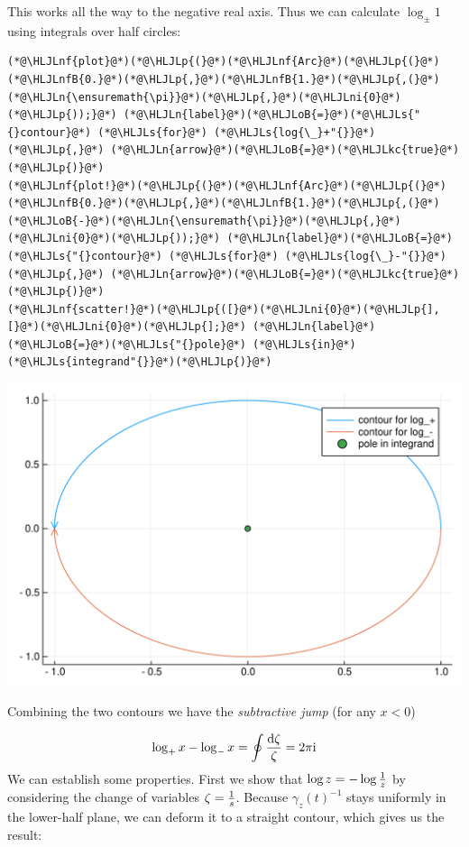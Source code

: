 \documentclass[12pt,a4paper]{article}
\newcommand{\HLJLkc}[1]{\textcolor[RGB]{59,151,46}{\textit{#1}}}
\newcommand{\HLJLn}[1]{#1}
\newcommand{\HLJLnf}[1]{\textcolor[RGB]{66,102,213}{#1}}
\newcommand{\HLJLs}[1]{\textcolor[RGB]{201,61,57}{#1}}
\newcommand{\HLJLnfB}[1]{\textcolor[RGB]{59,151,46}{#1}}
\newcommand{\HLJLni}[1]{\textcolor[RGB]{59,151,46}{#1}}
\newcommand{\HLJLoB}[1]{\textcolor[RGB]{102,102,102}{\textbf{#1}}}
\newcommand{\HLJLp}[1]{#1}
\def\D{ {\rm d} }
\def\I{ {\rm i} }
\begin{document}
This works all the way to the negative real axis. Thus we can calculate $\log_\pm 1$ using integrals over half circles:


\begin{lstlisting}
(*@\HLJLnf{plot}@*)(*@\HLJLp{(}@*)(*@\HLJLnf{Arc}@*)(*@\HLJLp{(}@*)(*@\HLJLnfB{0.}@*)(*@\HLJLp{,}@*)(*@\HLJLnfB{1.}@*)(*@\HLJLp{,(}@*)(*@\HLJLn{\ensuremath{\pi}}@*)(*@\HLJLp{,}@*)(*@\HLJLni{0}@*)(*@\HLJLp{));}@*) (*@\HLJLn{label}@*)(*@\HLJLoB{=}@*)(*@\HLJLs{"{}contour}@*) (*@\HLJLs{for}@*) (*@\HLJLs{log{\_}+"{}}@*)(*@\HLJLp{,}@*) (*@\HLJLn{arrow}@*)(*@\HLJLoB{=}@*)(*@\HLJLkc{true}@*)(*@\HLJLp{)}@*)
(*@\HLJLnf{plot!}@*)(*@\HLJLp{(}@*)(*@\HLJLnf{Arc}@*)(*@\HLJLp{(}@*)(*@\HLJLnfB{0.}@*)(*@\HLJLp{,}@*)(*@\HLJLnfB{1.}@*)(*@\HLJLp{,(}@*)(*@\HLJLoB{-}@*)(*@\HLJLn{\ensuremath{\pi}}@*)(*@\HLJLp{,}@*)(*@\HLJLni{0}@*)(*@\HLJLp{));}@*) (*@\HLJLn{label}@*)(*@\HLJLoB{=}@*)(*@\HLJLs{"{}contour}@*) (*@\HLJLs{for}@*) (*@\HLJLs{log{\_}-"{}}@*)(*@\HLJLp{,}@*) (*@\HLJLn{arrow}@*)(*@\HLJLoB{=}@*)(*@\HLJLkc{true}@*)(*@\HLJLp{)}@*)
(*@\HLJLnf{scatter!}@*)(*@\HLJLp{([}@*)(*@\HLJLni{0}@*)(*@\HLJLp{],[}@*)(*@\HLJLni{0}@*)(*@\HLJLp{];}@*) (*@\HLJLn{label}@*)(*@\HLJLoB{=}@*)(*@\HLJLs{"{}pole}@*) (*@\HLJLs{in}@*) (*@\HLJLs{integrand"{}}@*)(*@\HLJLp{)}@*)
\end{lstlisting}

\includegraphics[width=\linewidth]{figures/Lecture10_4_1.pdf}

Combining the two contours we have the \emph{subtractive jump} (for any $x < 0$)

\[
\log_+ x - \log_- x = \oint {\D\zeta \over \zeta}  = 2 \pi \I
\]
We can establish some properties. First we show that $\log z = - \log {1 \over z}$ by considering the change of variables  $\zeta = {1 \over s}$.  Because $\gamma_z(t)^{-1}$ stays uniformly in the lower-half plane, we can deform it to a straight contour, which gives us the result:
\end{document}
